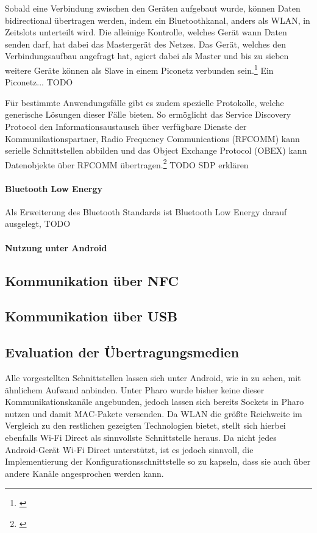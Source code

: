 \documentclass[12pt,a4paper]{article}
\begin{document}
            Sobald eine Verbindung zwischen den Geräten aufgebaut wurde, können Daten bidirectional übertragen werden, indem ein Bluetoothkanal, anders als WLAN, in Zeitslots unterteilt wird.
            Die alleinige Kontrolle, welches Gerät wann Daten senden darf, hat dabei das Mastergerät des Netzes. Das Gerät, welches den Verbindungsaufbau angefragt hat,
            agiert dabei als Master und bis zu sieben weitere Geräte können als Slave in einem Piconetz verbunden sein.\footnote{\cite[S.379f.]{Sauter}}
            Ein Piconetz... TODO

            Für bestimmte Anwendungsfälle gibt es zudem spezielle Protokolle, welche generische Lösungen dieser Fälle bieten.
            So ermöglicht das Service Discovery Protocol den Informationsaustausch über verfügbare Dienste der Kommunikationspartner,
            Radio Frequency Communications (RFCOMM) kann serielle Schnittstellen abbilden und das Object Exchange Protocol (OBEX) kann Datenobjekte über RFCOMM übertragen.\footnote{\cite[S.229]{Lueders}}
            TODO SDP erklären

            \paragraph{Bluetooth Low Energy}
            Als Erweiterung des Bluetooth Standards ist Bluetooth Low Energy darauf ausgelegt, TODO

            \paragraph{Nutzung unter Android}


        \subsection{Kommunikation über NFC}

        \subsection{Kommunikation über USB}

        \subsection{Evaluation der Übertragungsmedien}
        Alle vorgestellten Schnittstellen lassen sich unter Android, wie in \cite{test-repository} zu sehen, mit ähnlichem Aufwand anbinden. Unter Pharo wurde bisher keine dieser Kommunikationskanäle angebunden,
        jedoch lassen sich bereits Sockets in Pharo nutzen und damit MAC-Pakete versenden.
        Da WLAN die größte Reichweite im Vergleich zu den restlichen gezeigten Technologien bietet, stellt sich hierbei ebenfalls Wi-Fi Direct als sinnvollste Schnittstelle heraus.
        Da nicht jedes Android-Gerät Wi-Fi Direct unterstützt, ist es jedoch sinnvoll, die Implementierung der Konfigurationsschnittstelle so zu kapseln,
        dass sie auch über andere Kanäle angesprochen werden kann.
        
\end{document}

